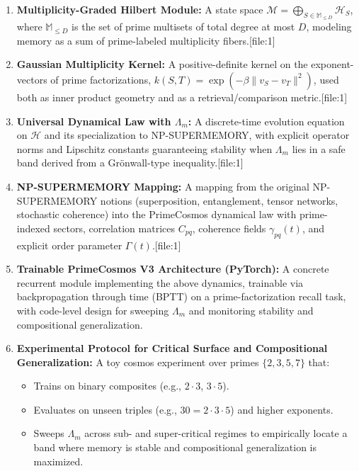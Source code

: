 \documentclass[11pt]{article}
\begin{document}
\begin{enumerate}[leftmargin=1.5em]
\item \textbf{Multiplicity-Graded Hilbert Module:} A state space $\mathcal{M}=\bigoplus_{S\in\mathbb{M}_{\le D}} \mathcal{H}_S$, where $\mathbb{M}_{\le D}$ is the set of prime multisets of total degree at most $D$, modeling memory as a sum of prime-labeled multiplicity fibers.[file:1]
\item \textbf{Gaussian Multiplicity Kernel:} A positive-definite kernel on the exponent-vectors of prime factorizations, $k(S,T)=\exp(-\beta \|v_S-v_T\|^2)$, used both as inner product geometry and as a retrieval/comparison metric.[file:1]
\item \textbf{Universal Dynamical Law with $\Lambda_m$:} A discrete-time evolution equation on $\mathcal{H}$ and its specialization to NP-SUPERMEMORY, with explicit operator norms and Lipschitz constants guaranteeing stability when $\Lambda_m$ lies in a safe band derived from a Grönwall-type inequality.[file:1]
\item \textbf{NP-SUPERMEMORY Mapping:} A mapping from the original NP-SUPERMEMORY notions (superposition, entanglement, tensor networks, stochastic coherence) into the PrimeCosmos dynamical law with prime-indexed sectors, correlation matrices $C_{pq}$, coherence fields $\gamma_{pq}(t)$, and explicit order parameter $\Gamma(t)$.[file:1]
\item \textbf{Trainable PrimeCosmos V3 Architecture (PyTorch):} A concrete recurrent module implementing the above dynamics, trainable via backpropagation through time (BPTT) on a prime-factorization recall task, with code-level design for sweeping $\Lambda_m$ and monitoring stability and compositional generalization.
\item \textbf{Experimental Protocol for Critical Surface and Compositional Generalization:} A toy cosmos experiment over primes $\{2,3,5,7\}$ that:
    \begin{itemize}
    \item Trains on binary composites (e.g., $2\cdot 3$, $3\cdot 5$).
    \item Evaluates on unseen triples (e.g., $30 = 2\cdot 3\cdot 5$) and higher exponents.
    \item Sweeps $\Lambda_m$ across sub- and super-critical regimes to empirically locate a band where memory is stable and compositional generalization is maximized.
    \end{itemize}
\end{enumerate}
\end{document}
